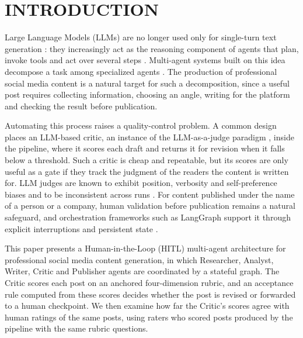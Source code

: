 \documentclass[a4paper,twoside]{article}
\begin{document}
\section{\uppercase{Introduction}}
\label{sec:introduction}

Large Language Models (LLMs) are no longer used only for single-turn text generation \cite{brown2020language}: they increasingly act as the reasoning component of agents that plan, invoke tools and act over several steps \cite{yao2023react,arunkumar2026agentic}. Multi-agent systems built on this idea decompose a task among specialized agents \cite{hong2024metagpt,wu2024autogen}. The production of professional social media content is a natural target for such a decomposition, since a useful post requires collecting information, choosing an angle, writing for the platform and checking the result before publication.

Automating this process raises a quality-control problem. A common design places an LLM-based critic, an instance of the LLM-as-a-judge paradigm \cite{zheng2023judging,gu2026survey}, inside the pipeline, where it scores each draft and returns it for revision when it falls below a threshold. Such a critic is cheap and repeatable, but its scores are only useful as a gate if they track the judgment of the readers the content is written for. LLM judges are known to exhibit position, verbosity and self-preference biases \cite{zheng2023judging,panickssery2024llm} and to be inconsistent across runs \cite{stureborg2024inconsistent}. For content published under the name of a person or a company, human validation before publication remains a natural safeguard, and orchestration frameworks such as LangGraph support it through explicit interruptions and persistent state \cite{langgraph}.

This paper presents a Human-in-the-Loop (HITL) multi-agent architecture for professional social media content generation, in which Researcher, Analyst, Writer, Critic and Publisher agents are coordinated by a stateful graph. The Critic scores each post on an anchored four-dimension rubric, and an acceptance rule computed from these scores decides whether the post is revised or forwarded to a human checkpoint. We then examine how far the Critic's scores agree with human ratings of the same posts, using \NRaters{} raters who scored \NPosts{} posts produced by the pipeline with the same rubric questions.
\end{document}
